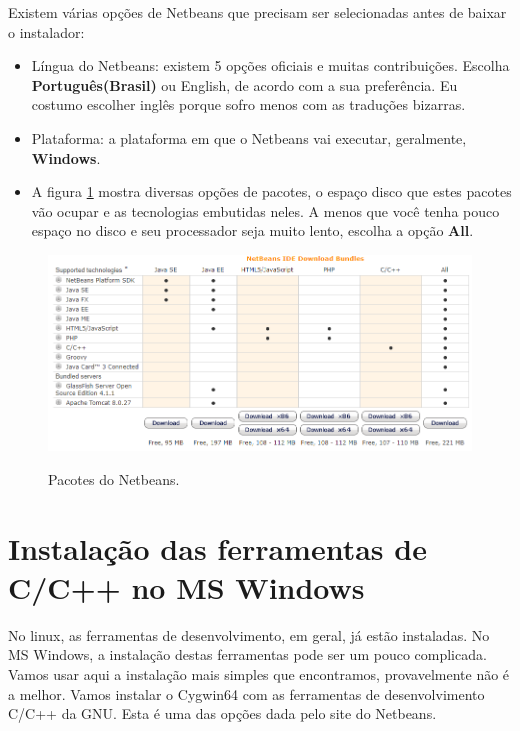 \documentclass[
	12pt,				%
	twoside,			%
	a4paper,			%
	english,			%
	french,				%
	spanish,			%
	brazil				%
	]{abntex2}
\begin{document}
Existem várias opções de Netbeans que precisam ser selecionadas antes de baixar o instalador:
\begin{itemize}
\item Língua do Netbeans: existem 5 opções oficiais e muitas contribuições. Escolha \textbf{Português(Brasil)} ou English, de acordo com a sua preferência. Eu costumo escolher inglês porque sofro menos com as traduções bizarras.
\item Plataforma: a plataforma em que o Netbeans vai executar, geralmente, \textbf{Windows}.
\item A figura \ref{fig:nb_bundles} mostra diversas opções de pacotes, o espaço disco que estes pacotes vão ocupar e as tecnologias embutidas neles. A menos que você tenha pouco espaço no disco e seu processador seja muito lento, escolha a opção \textbf{All}.
\end{itemize}

\begin{figure}[h]
\begin{center}
\includegraphics[scale=0.4]{NB_bundles.png} 
\caption{Pacotes do Netbeans.}
\label{fig:nb_bundles}
\end{center}
\end{figure}

\section{Instalação das ferramentas de C/C++ no MS Windows}

No linux, as ferramentas de desenvolvimento, em geral, já estão instaladas. No MS Windows, a 
instalação destas ferramentas pode ser um pouco complicada. Vamos usar aqui a instalação
mais simples que encontramos, provavelmente não é a melhor. Vamos instalar o Cygwin64 com as
ferramentas de desenvolvimento C/C++ da GNU. Esta é uma das opções dada pelo site do Netbeans.
\end{document}
